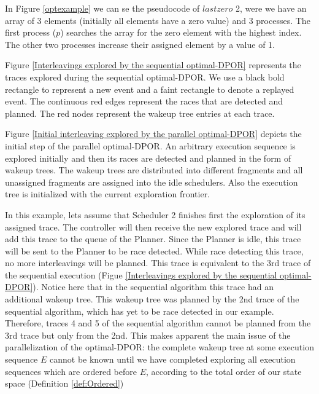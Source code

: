 In Figure \ref{optexample} we can se the pseudocode of $lastzero$ 2, were we have an array of 3 elements (initially all elements have
a zero value) and 3 processes. The first process ($p$) searches the array for the zero element with the highest index. 
The other two processes increase their assigned element by a value of 1.


Figure \ref{Interleavings explored by the sequential optimal-DPOR} represents 
the traces explored during the sequential optimal-DPOR.
We use a black bold rectangle to represent a new event and a faint rectangle to denote a replayed event. 
The continuous red edges represent the races that are detected and planned. The red nodes represent the wakeup tree entries
at each trace.


Figure \ref{Initial interleaving explored by the parallel optimal-DPOR} depicts the initial step of the parallel optimal-DPOR. 
An arbitrary execution sequence is explored initially and then its races are detected and planned in the form of wakeup trees.
The wakeup trees are distributed into different fragments and all unassigned fragments are assigned into the idle schedulers.
Also the execution tree is initialized with the current exploration frontier.

In this example, lets assume that Scheduler 2 finishes first the exploration of its assigned trace. The controller will
then receive the new explored trace and will add this trace to the queue of the Planner. Since the Planner is idle,
this trace will be sent to the Planner to be race detected. While race detecting this trace, no more interleavings will be 
planned. This trace is equivalent to the 3rd trace of the sequential execution 
(Figue \ref{Interleavings explored by the sequential optimal-DPOR}). Notice here that in the sequential algorithm
this trace had an additional wakeup tree. This wakeup tree was planned by the 2nd trace of the sequential algorithm,
which has yet to be race detected in our example. Therefore, traces 4 and 5 of the sequential algorithm cannot be
planned from the 3rd trace but only from the 2nd. This makes apparent the main issue of the parallelization of the optimal-DPOR:
the complete wakeup tree at some execution sequence $E$ cannot be known until we have completed
exploring all execution sequences which are ordered before $E$, according to the total order of our state space
(Definition \ref{def:Ordered})